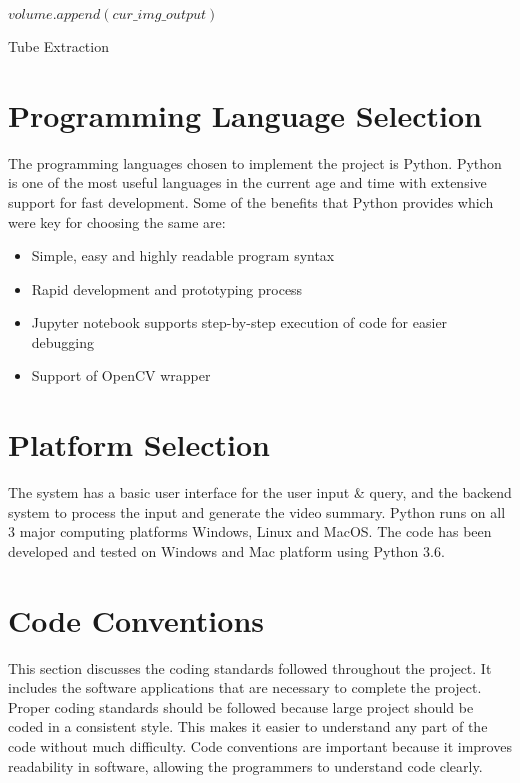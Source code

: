 \begin{algorithm}
{{{                }
            }
            \(volume.append(cur\_img\_output)\)
        }

        \caption{Tube Extraction}
        \label{algorithm:tube-extraction}
    \end{algorithm}

\section{Programming Language Selection}
The programming languages chosen to implement the project is Python. Python is
one of the most useful languages in the current age and time with extensive
support for fast development. Some of the benefits that Python provides which
were key for choosing the same are:

\begin{itemize}
    \item Simple, easy and highly readable program syntax
    \item Rapid development and prototyping process
    \item Jupyter notebook supports step-by-step execution of code for easier
    debugging
    \item Support of OpenCV wrapper
\end{itemize}


\section{Platform Selection}
The system has a basic user interface for the user input \& query, and the
backend system to process the input and generate the video summary. Python runs
on all 3 major computing platforms Windows, Linux and MacOS. The code has been
developed and tested on Windows and Mac platform using Python 3.6.

\section{Code Conventions}

This section discusses the coding standards followed throughout the project. It
includes the software applications that are necessary to complete the project.
Proper coding standards should be followed because large project should be coded
in a consistent style. This makes it easier to understand any part of the code
without much difficulty. Code conventions are important because it improves
readability in software, allowing the programmers to understand code clearly.

